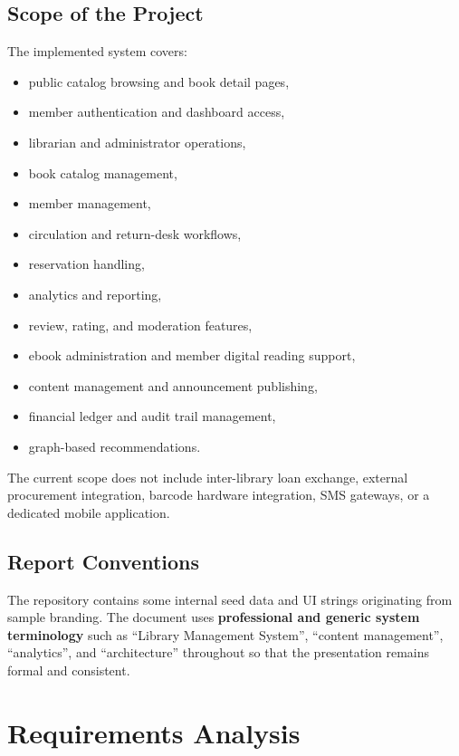 \documentclass[12pt,a4paper]{report}
\begin{document}
\section{Scope of the Project}
The implemented system covers:
\begin{itemize}[leftmargin=1.5em]
    \item public catalog browsing and book detail pages,
    \item member authentication and dashboard access,
    \item librarian and administrator operations,
    \item book catalog management,
    \item member management,
    \item circulation and return-desk workflows,
    \item reservation handling,
    \item analytics and reporting,
    \item review, rating, and moderation features,
    \item ebook administration and member digital reading support,
    \item content management and announcement publishing,
    \item financial ledger and audit trail management,
    \item graph-based recommendations.
\end{itemize}

The current scope does not include inter-library loan exchange, external procurement integration, barcode hardware integration, SMS gateways, or a dedicated mobile application.

\section{Report Conventions}
The repository contains some internal seed data and UI strings originating from sample branding. The document uses \textbf{professional and generic system terminology} such as ``Library Management System'', ``content management'', ``analytics'', and ``architecture'' throughout so that the presentation remains formal and consistent.

\chapter{Requirements Analysis}
\end{document}
